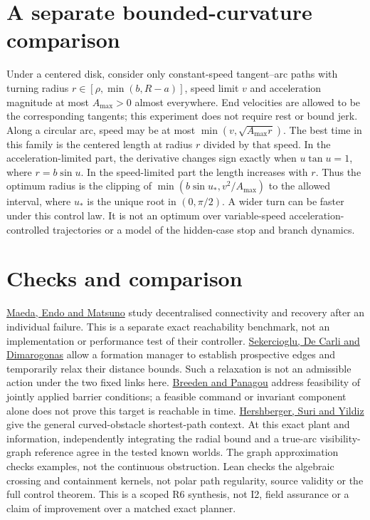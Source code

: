 \documentclass[11pt]{article}
\begin{document}
\section{A separate bounded-curvature comparison}
Under a centered disk, consider only constant-speed tangent--arc
paths with turning radius \(r\in[\rho,\min(b,R-a)]\), speed
limit \(v\) and acceleration magnitude at most \(A_{\max}>0\)
almost everywhere. End velocities are allowed to be the
corresponding tangents; this experiment does not require rest
or bound jerk. Along a circular arc, speed may be at most
\(\min(v,\sqrt{A_{\max}r})\). The best time in this family is
the centered length at radius \(r\) divided by that speed.
In the acceleration-limited part, the derivative changes sign
exactly when \(u\tan u=1\), where \(r=b\sin u\).
In the speed-limited part the length increases with \(r\).
Thus the optimum radius is the clipping of
\(\min(b\sin u_*,v^2/A_{\max})\) to the allowed interval,
where \(u_*\) is the unique root in \((0,\pi/2)\).
A wider turn can be faster under this control law.
It is not an optimum over variable-speed acceleration-controlled
trajectories or a model of the hidden-case stop and branch dynamics.

\section{Checks and comparison}
\href{https://doi.org/10.1016/j.jfranklin.2023.05.013}{Maeda,
Endo and Matsuno} study decentralised connectivity and recovery
after an individual failure. This is a separate exact reachability
benchmark, not an implementation or performance test of their
controller. \href{https://arxiv.org/abs/2609.29939}{Sekercioglu,
De Carli and Dimarogonas} allow a formation manager to establish
prospective edges and temporarily relax their distance bounds.
Such a relaxation is not an admissible action under the two
fixed links here. \href{https://arxiv.org/abs/2210.01354}{Breeden
and Panagou} address feasibility of jointly applied barrier
conditions; a feasible command or invariant component alone
does not prove this target is reachable in time.
\href{https://epubs.siam.org/doi/10.1137/21M1428248}{Hershberger,
Suri and Yildiz} give the general curved-obstacle shortest-path
context. At this exact plant and information, independently
integrating the radial bound and a true-arc visibility-graph
reference agree in the tested known worlds. The graph
approximation checks examples, not the continuous obstruction.
Lean checks the algebraic crossing and containment kernels,
not polar path regularity, source validity or the full control
theorem. This is a scoped R6 synthesis, not I2, field assurance
or a claim of improvement over a matched exact planner.
\end{document}
